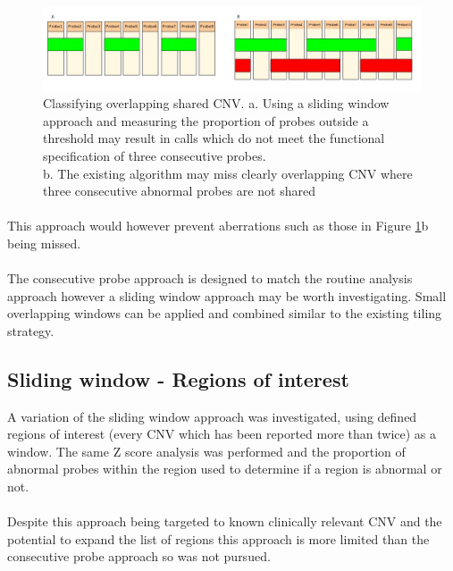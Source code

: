 \begin{figure}[h]
\centering
\includegraphics[width=1\linewidth]{./Figures/incorrectcallandalternatecomb}
\caption[Classifying overlapping shared CNV]{Classifying overlapping shared CNV. a. Using a sliding window approach and measuring the proportion of probes outside a threshold may result in calls which do not meet the functional specification of three consecutive probes.\\
b. The existing algorithm may miss clearly overlapping CNV where three consecutive abnormal probes are not shared}
\label{fig:incorrectcallandalternatecomb}
\end{figure}
\paragraph*{}
This approach would however prevent aberrations such as those in Figure \ref{fig:incorrectcallandalternatecomb}b being missed.
\paragraph*{}
The consecutive probe approach is designed to match the routine analysis approach however a sliding window approach may be worth investigating. Small overlapping windows can be applied and combined similar to the existing tiling strategy.

\subsection{Sliding window - Regions of interest}
A variation of the sliding window approach was investigated, using defined regions of interest (every CNV which has been reported more than twice) as a window. The same Z score analysis was performed and the proportion of abnormal probes within the region used to determine if a region is abnormal or not.
\paragraph*{}
Despite this approach being targeted to known clinically relevant CNV and the potential to expand the list of regions this approach is more limited than the consecutive probe approach so was not pursued.

